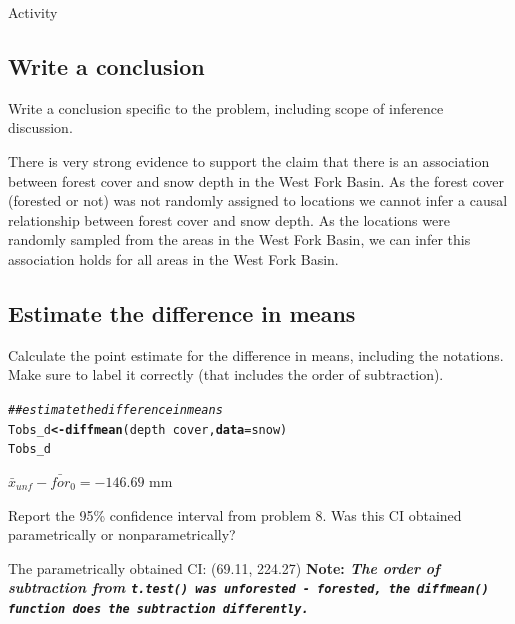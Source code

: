 \documentclass[12pt]{article}\usepackage[]{graphicx}\usepackage[]{color}
\makeatletter
\newcommand{\hlcom}[1]{\textcolor[rgb]{0.4,0.4,0.4}{\textit{#1}}}%
\newcommand{\hlopt}[1]{\textcolor[rgb]{0,0,0}{\textbf{#1}}}%
\newcommand{\hlstd}[1]{\textcolor[rgb]{0,0,0}{#1}}%
\newcommand{\hlkwb}[1]{\textcolor[rgb]{0,0,0}{\textbf{#1}}}%
\newcommand{\hlkwc}[1]{\textcolor[rgb]{0,0,0}{\textbf{#1}}}%
\newcommand{\hlkwd}[1]{\textcolor[rgb]{0,0,0}{\textbf{#1}}}%
\newenvironment{kframe}{%
 \def\at@end@of@kframe{}%
 \ifinner\ifhmode%
  \def\at@end@of@kframe{\end{minipage}}%
  \begin{minipage}{\columnwidth}%
 \fi\fi%
 \def\FrameCommand##1{\hskip\@totalleftmargin \hskip-\fboxsep
 \colorbox{shadecolor}{##1}\hskip-\fboxsep
     \hskip-\linewidth \hskip-\@totalleftmargin \hskip\columnwidth}%
 \MakeFramed {\advance\hsize-\width
   \@totalleftmargin\z@ \linewidth\hsize
   \@setminipage}}%
 {\par\unskip\endMakeFramed%
 \at@end@of@kframe}
\newenvironment{knitrout}{}{} %
\renewenvironment{knitrout}{\begin{footnotesize}}{\end{footnotesize}}
\makeatother
\begin{document}
\begin{exam}{Activity}
\subsection*{Write a conclusion}
\begin{problem}
Write a conclusion specific to the problem, including scope of inference discussion.
\begin{solution}[2cm]
There is very strong evidence to support the claim that there is an association between forest cover and snow depth in the West Fork Basin. As the forest cover (forested or not) was not randomly assigned to locations we cannot infer a causal relationship between forest cover and snow depth. As the locations were randomly sampled from the areas in the West Fork Basin, we can infer this association holds for all areas in the West Fork Basin.
\end{solution}
\end{problem}



\pagebreak

\subsection*{Estimate the difference in means}
\begin{problem}
Calculate the point estimate for the difference in means, including the notations. Make sure to label it correctly (that includes the order of subtraction).

\begin{knitrout}\footnotesize
{}\color{fgcolor}\begin{kframe}
\begin{alltt}
\hlcom{## estimate the difference in means}
\hlstd{Tobs_d} \hlkwb{<-} \hlkwd{diffmean}\hlstd{(depth} \hlopt{~} \hlstd{cover,} \hlkwc{data} \hlstd{= snow)}
\hlstd{Tobs_d}
\end{alltt}
\end{kframe}
\end{knitrout}

\begin{solution}[1cm]
$\bar{x}_{unf} - \bar{for}_0 = -146.69$ mm
\end{solution}
\end{problem}


\begin{problem}
Report the 95\% confidence interval from problem 8. Was this CI obtained parametrically or nonparametrically?
\begin{solution}[2cm]
The parametrically obtained CI: (69.11, 224.27) \bf Note: \it The order of subtraction from \tt t.test() \it was unforested - forested, the \tt diffmean() \it function does the subtraction differently.
\end{solution}
\end{problem}



\end{exam}
\end{document}
